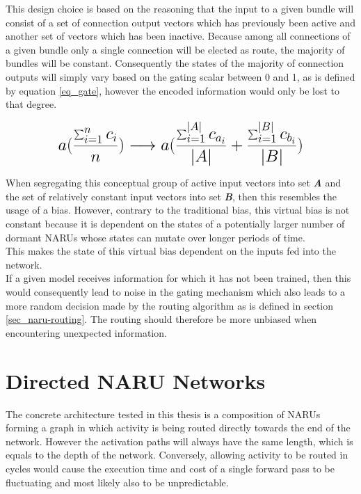 This design choice is based on the reasoning that the input to a given bundle
will consist of a set of connection output vectors which has previously been active
and another set of vectors which has been inactive.
Because among all connections of a given bundle only a single connection will be 
elected as route, the majority of bundles will be constant.
Consequently the states of the majority of connection outputs will simply
vary based on the gating scalar between 0 and 1, as is defined by equation \ref{eq_gate}, however the encoded information
would only be lost to that degree.


\begin{gather} 
\mbox{\LARGE$\displaystyle
 a( \frac{\sum_{i=1}^{n} c_i}{n} ) 
 \longrightarrow 
 a( \frac{\sum_{i=1}^{|A|} c_{a_i}}{|A|} + \frac{\sum_{i=1}^{|B|} c_{b_i}}{|B|}  ) 
$}
\end{gather}

When segregating this conceptual group of active input vectors into set \textit{\textbf{A}}
and the set of relatively constant input vectors into set \textit{\textbf{B}}, then
this resembles the usage of a bias. 
However, contrary to the traditional bias, this virtual bias is not constant because it is
dependent on the states of a potentially larger number
of dormant \acp{NARU} whose states can mutate over longer periods of time. \\

This makes the state of this virtual bias dependent on the inputs fed into the network. \\
If a given model receives information for which it has not been trained, then
this would consequently lead to noise in the gating mechanism which also leads to a more random decision made by the routing algorithm as is defined in section \ref{sec_naru-routing}. The routing should therefore be more unbiased when encountering unexpected information.  

\clearpage

\section{Directed NARU Networks}

The concrete architecture tested in this thesis
is a composition of \acp{NARU} forming a graph in
which activity is being routed directly towards the end of the network.
However the activation paths will always have
the same length, which is equals to the depth of the network.
Conversely, allowing activity to be routed in cycles
would cause the execution time and cost of a single forward pass
to be fluctuating and most likely also to be unpredictable.

